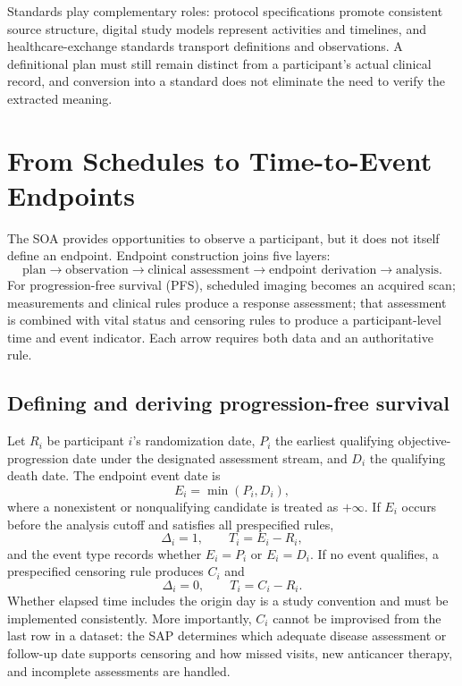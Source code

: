 \documentclass[12pt,oneside]{book}
\numberwithin{equation}{section}
\theoremstyle{definition}
\theoremstyle{plain}
\theoremstyle{remark}
\begin{document}
Standards play complementary roles: protocol specifications promote consistent
source structure, digital study models represent activities and timelines, and
healthcare-exchange standards transport definitions and observations.  A
definitional plan must still remain distinct from a participant's actual
clinical record, and conversion into a standard does not eliminate the need to
verify the extracted meaning.

\section{From Schedules to Time-to-Event Endpoints}

The SOA provides opportunities to observe a participant, but it does not itself
define an endpoint.  Endpoint construction joins five layers:
\[
 \text{plan}\longrightarrow\text{observation}
 \longrightarrow\text{clinical assessment}
 \longrightarrow\text{endpoint derivation}
 \longrightarrow\text{analysis}.
\]
For progression-free survival (PFS), scheduled imaging becomes an acquired
scan; measurements and clinical rules produce a response assessment; that
assessment is combined with vital status and censoring rules to produce a
participant-level time and event indicator.  Each arrow requires both data and
an authoritative rule.

\subsection{Defining and deriving progression-free survival}

Let $R_i$ be participant $i$'s randomization date, $P_i$ the earliest qualifying
objective-progression date under the designated assessment stream, and $D_i$
the qualifying death date.  The endpoint event date is
\[
  E_i=\min(P_i,D_i),
\]
where a nonexistent or nonqualifying candidate is treated as $+\infty$.  If
$E_i$ occurs before the analysis cutoff and satisfies all prespecified rules,
\[
  \Delta_i=1,
  \qquad
  T_i=E_i-R_i,
\]
and the event type records whether $E_i=P_i$ or $E_i=D_i$.  If no event
qualifies, a prespecified censoring rule produces $C_i$ and
\[
  \Delta_i=0,
  \qquad
  T_i=C_i-R_i.
\]
Whether elapsed time includes the origin day is a study convention and must be
implemented consistently.  More importantly, $C_i$ cannot be improvised from
the last row in a dataset: the SAP determines which adequate disease assessment
or follow-up date supports censoring and how missed visits, new anticancer
therapy, and incomplete assessments are handled.
\end{document}

